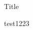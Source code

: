 \documentclass[12pt]{article}
\begin{document}
\begin{doublespace}
\vspace*{20pt}
    \begin{center}
    \large{Title}
    \end{center}
test1223

\end{doublespace}
\end{document}
